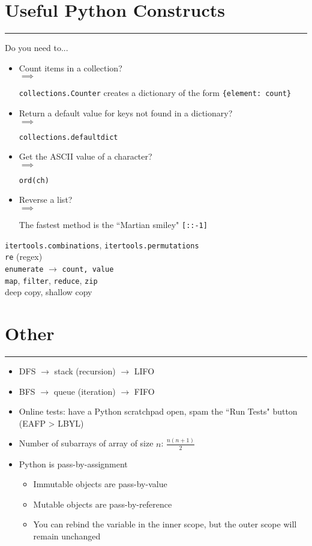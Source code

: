 \documentclass[12pt]{article}
\newcommand{\imply}[1]{
  \-\hspace{1em}$\implies$ \parbox[t]{11.2cm}{#1}
}
\begin{document}
\section*{Useful Python Constructs}
\hrule\vspace{5ex}

Do you need to...
\begin{itemize}
  \item Count items in a collection? \smallskip\\
    \imply{\texttt{collections.Counter} creates a dictionary of the form \texttt{\{element: count\}}}
  \item Return a default value for keys not found in a dictionary? \smallskip\\
    \imply{\texttt{collections.defaultdict}}
  \item Get the ASCII value of a character? \smallskip\\
    \imply{\texttt{ord(ch)}}
  \item Reverse a list? \smallskip\\
    \imply{The fastest method is the ``Martian smiley" \texttt{[::-1]}}
\end{itemize}

\texttt{itertools.combinations}, \texttt{itertools.permutations} \\
\texttt{re} (regex) \\
\texttt{enumerate} $\rightarrow$ \texttt{count, value} \\
\texttt{map}, \texttt{filter}, \texttt{reduce}, \texttt{zip} \\
deep copy, shallow copy

\section*{Other}
\hrule\vspace{5ex}

\begin{itemize}
  \item DFS $\rightarrow$ stack (recursion) $\rightarrow$ LIFO
  \item BFS $\rightarrow$ queue (iteration) $\rightarrow$ FIFO
  \item Online tests: have a Python scratchpad open, spam the ``Run Tests" button (EAFP > LBYL)
  \item Number of subarrays of array of size $n$: $\frac{n(n+1)}{2}$
  \item Python is pass-by-assignment
  \begin{itemize}
    \item Immutable objects are pass-by-value
    \item Mutable objects are pass-by-reference
    \item You can rebind the variable in the inner scope, but the outer scope will remain unchanged
  \end{itemize}
\end{itemize}
\end{document}
